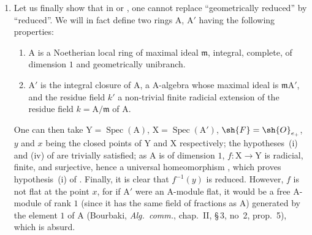 \begin{remarks}[15.2.4]
\begin{enumerate}[label=(\roman*)]
The only point $x$ of $\mathrm{X}$ above the point $y$ corresponding to the maximal ideal $(s)+(t)$ is such that, as the class $\bar{u}$ of $u$ in $\sh{O}_z/\mathfrak{m}_y\sh{O}_z$ satisfies $\bar{u}^2=0$, $f^{-1}(y)$ is not a reduced $\mathbf{k}(y)$-prescheme.
Here $f$ is a finite morphism , but it is not flat at the point $x$, for if $\sh{O}_z$ were an $\mathrm{A}$-module flat, it would be a free $\sh{O}_y$-module (Bourbaki, \emph{Alg.\ comm.}, chap.~II, \S\,3, no~2, prop.~5), which is absurd.
  \item Let us finally show that in  or , one cannot replace ``geometrically reduced'' by ``reduced''.
We will in fact define two rings $\mathrm{A}$, $\mathrm{A}'$ having the following properties:
\begin{enumerate}[label=\arabic*)]
  \item $\mathrm{A}$ is a Noetherian local ring of maximal ideal $\mathfrak{m}$, integral, complete, of dimension $1$ and geometrically unibranch.
  \item $\mathrm{A}'$ is the integral closure of $\mathrm{A}$, a $\mathrm{A}$-algebra whose maximal ideal is $\mathfrak{m}\mathrm{A}'$, and the residue field $k'$ a non-trivial finite radicial extension of the residue field $k=\mathrm{A}/\mathfrak{m}$ of $\mathrm{A}$.
\end{enumerate}
One can then take $\mathrm{Y}=\operatorname{Spec}(\mathrm{A})$, $\mathrm{X}=\operatorname{Spec}(\mathrm{A}')$, $\sh{F}=\sh{O}_{e_+}$, $y$ and $x$ being the closed points of $\mathrm{Y}$ and $\mathrm{X}$ respectively; the hypotheses~(i) and (iv) of  are trivially satisfied; as $\mathrm{A}$ is of dimension $1$, $f:\mathrm{X}\to\mathrm{Y}$ is radicial, finite, and surjective, hence a universal homeomorphism , which proves hypothesis~(i) of .
Finally, it is clear that $f^{-1}(y)$ is reduced.
However, $f$ is not flat at the point $x$, for if $\mathrm{A}'$ were an $\mathrm{A}$-module flat, it would be a free $\mathrm{A}$-module of rank $1$ (since it has the same field of fractions as $\mathrm{A}$) generated by the element $1$ of $\mathrm{A}$ (Bourbaki, \emph{Alg.\ comm.}, chap.~II, \S\,3, no~2, prop.~5), which is absurd.


\end{enumerate}
\end{remarks}
